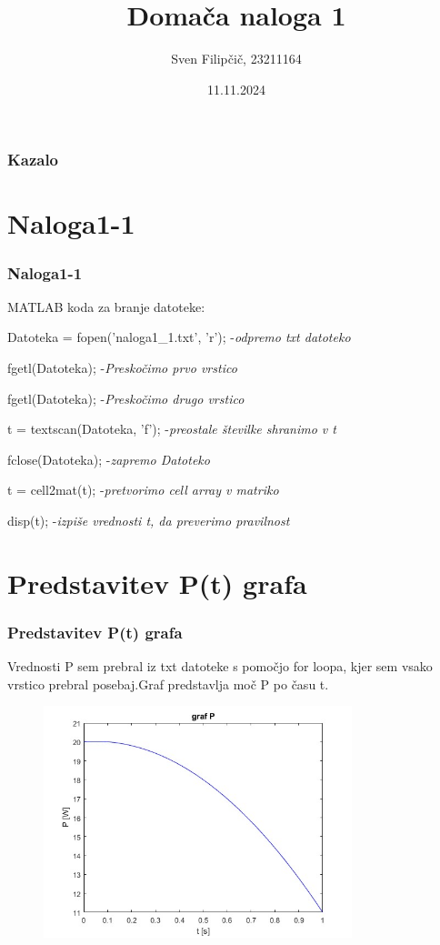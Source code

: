 \documentclass{beamer}
\title{Domača naloga 1}  %
\author{Sven Filipčič, 23211164}                   %
\date{11.11.2024}                        %
\begin{document}
\begin{frame}
    \titlepage
\end{frame}

\begin{frame}
    \frametitle{\textbf{Kazalo}}
    \tableofcontents
\end{frame}

\section{Naloga1-1}
\begin{frame}
    \frametitle{Naloga1-1}
    MATLAB koda za branje datoteke:
    
    Datoteka = fopen('naloga1_1.txt', 'r');  -\textit{odpremo txt datoteko} 
    
    fgetl(Datoteka);  -\textit{Preskočimo prvo vrstico}
    
    fgetl(Datoteka);  -\textit{Preskočimo drugo vrstico}
    
    t = textscan(Datoteka, 'f'); -\textit{preostale številke shranimo v t}
    
    fclose(Datoteka); -\textit{zapremo Datoteko }
    
    t = cell2mat(t); -\textit{pretvorimo cell array v matriko}
    
    disp(t); -\textit{izpiše vrednosti t, da preverimo pravilnost}
    
    
\end{frame}

\section{Predstavitev P(t) grafa}
\begin{frame}
    \frametitle{Predstavitev P(t) grafa}
    Vrednosti P sem prebral iz txt datoteke s pomočjo for loopa, kjer sem vsako vrstico prebral posebaj.Graf predstavlja moč P po času t.
    \begin{figure}[ht] 
    \centering
    \includegraphics[width=0.8\textwidth]{GrafP.jpg}
    \end{figure}

\end{frame}
\end{document}
